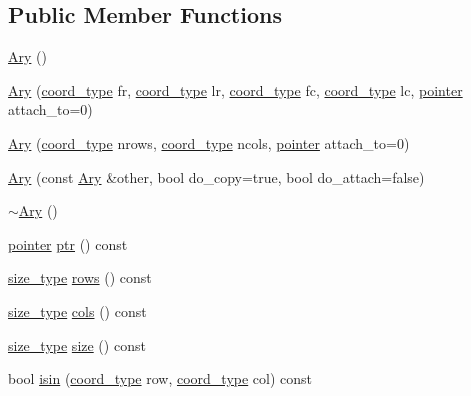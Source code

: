 \subsection*{Public Member Functions}
\begin{CompactItemize}
\item 
\hyperlink{structutls_1_1Ary_2c088eda97ba856c1de2555860dc0efc}{Ary} ()
\item 
\hyperlink{structutls_1_1Ary_d03b3a2394949e4f97d968ad9037dfe6}{Ary} (\hyperlink{structutls_1_1Ary_907420b899d180bd0ae87c3995316f18}{coord\_\-type} fr, \hyperlink{structutls_1_1Ary_907420b899d180bd0ae87c3995316f18}{coord\_\-type} lr, \hyperlink{structutls_1_1Ary_907420b899d180bd0ae87c3995316f18}{coord\_\-type} fc, \hyperlink{structutls_1_1Ary_907420b899d180bd0ae87c3995316f18}{coord\_\-type} lc, \hyperlink{structutls_1_1Ary_9eb735fe995ca9b5faaef9b176a08583}{pointer} attach\_\-to=0)
\item 
\hyperlink{structutls_1_1Ary_ed07a325cd081be6dc5f796a0f7fd259}{Ary} (\hyperlink{structutls_1_1Ary_907420b899d180bd0ae87c3995316f18}{coord\_\-type} nrows, \hyperlink{structutls_1_1Ary_907420b899d180bd0ae87c3995316f18}{coord\_\-type} ncols, \hyperlink{structutls_1_1Ary_9eb735fe995ca9b5faaef9b176a08583}{pointer} attach\_\-to=0)
\item 
\hyperlink{structutls_1_1Ary_949d8ece6fb57dd9e190ac9b2b3eabe6}{Ary} (const \hyperlink{structutls_1_1Ary}{Ary} \&other, bool do\_\-copy=true, bool do\_\-attach=false)
\item 
\hyperlink{structutls_1_1Ary_87106fce9be66a0532f3ae8a61fbd782}{$\sim$Ary} ()
\item 
\hyperlink{structutls_1_1Ary_9eb735fe995ca9b5faaef9b176a08583}{pointer} \hyperlink{structutls_1_1Ary_cddfbaf22b3c0ccad8a31cf2534dbb9b}{ptr} () const 
\item 
\hyperlink{structutls_1_1Ary_8811de4f35f83e989511aaddf003376c}{size\_\-type} \hyperlink{structutls_1_1Ary_5e872410be8ad5d9a8fb529260c37f9f}{rows} () const 
\item 
\hyperlink{structutls_1_1Ary_8811de4f35f83e989511aaddf003376c}{size\_\-type} \hyperlink{structutls_1_1Ary_1bc272d4ce305a76fad63a9d9a0ed233}{cols} () const 
\item 
\hyperlink{structutls_1_1Ary_8811de4f35f83e989511aaddf003376c}{size\_\-type} \hyperlink{structutls_1_1Ary_3889fe21871116ca89694757b82575b6}{size} () const 
\item 
bool \hyperlink{structutls_1_1Ary_881effb705efcaf470dee372be3f3353}{isin} (\hyperlink{structutls_1_1Ary_907420b899d180bd0ae87c3995316f18}{coord\_\-type} row, \hyperlink{structutls_1_1Ary_907420b899d180bd0ae87c3995316f18}{coord\_\-type} col) const 

\end{CompactItemize}
